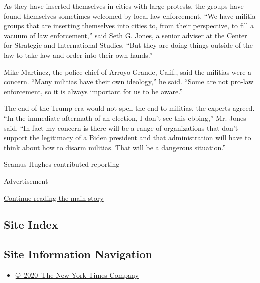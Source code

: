 As they have inserted themselves in cities with large protests, the
groups have found themselves sometimes welcomed by local law
enforcement. ``We have militia groups that are inserting themselves into
cities to, from their perspective, to fill a vacuum of law
enforcement,'' said Seth G. Jones, a senior adviser at the Center for
Strategic and International Studies. ``But they are doing things outside
of the law to take law and order into their own hands.''

Mike Martinez, the police chief of Arroyo Grande, Calif., said the
militias were a concern. ``Many militias have their own ideology,'' he
said. ``Some are not pro-law enforcement, so it is always important for
us to be aware.''

The end of the Trump era would not spell the end to militias, the
experts agreed. ``In the immediate aftermath of an election, I don't see
this ebbing,'' Mr. Jones said. ``In fact my concern is there will be a
range of organizations that don't support the legitimacy of a Biden
president and that administration will have to think about how to disarm
militias. That will be a dangerous situation.''

Seamus Hughes contributed reporting

Advertisement

\protect\hyperlink{after-bottom}{Continue reading the main story}

\hypertarget{site-index}{%
\subsection{Site Index}\label{site-index}}

\hypertarget{site-information-navigation}{%
\subsection{Site Information
Navigation}\label{site-information-navigation}}

\begin{itemize}
\tightlist
\item
  \href{https://help.nytimes3xbfgragh.onion/hc/en-us/articles/115014792127-Copyright-notice}{©~2020~The
  New York Times Company}
\end{itemize}

